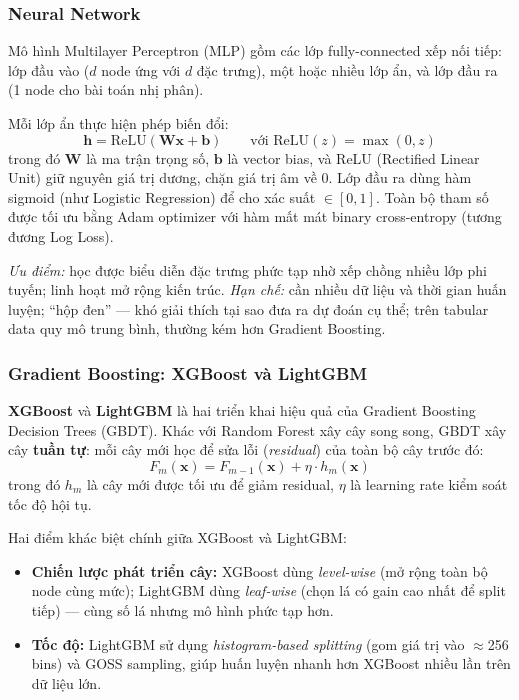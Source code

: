 \subsubsection{Neural Network}

Mô hình Multilayer Perceptron (MLP) gồm các lớp fully-connected
xếp nối tiếp: lớp đầu vào ($d$ node ứng với $d$ đặc trưng),
một hoặc nhiều lớp ẩn, và lớp đầu ra (1 node cho bài toán nhị phân).

Mỗi lớp ẩn thực hiện phép biến đổi:
\[
\mathbf{h} = \text{ReLU}(\mathbf{W}\mathbf{x} + \mathbf{b})
\qquad \text{với } \text{ReLU}(z) = \max(0, z)
\]
trong đó $\mathbf{W}$ là ma trận trọng số, $\mathbf{b}$ là vector bias,
và ReLU (Rectified Linear Unit) giữ nguyên giá trị dương, chặn giá trị âm về 0.
Lớp đầu ra dùng hàm sigmoid (như Logistic Regression) để cho xác suất $\in [0, 1]$.
Toàn bộ tham số được tối ưu bằng Adam optimizer
với hàm mất mát binary cross-entropy (tương đương Log Loss).

\textit{Ưu điểm:} học được biểu diễn đặc trưng phức tạp nhờ xếp chồng
nhiều lớp phi tuyến; linh hoạt mở rộng kiến trúc.
\textit{Hạn chế:} cần nhiều dữ liệu và thời gian huấn luyện;
``hộp đen'' --- khó giải thích tại sao đưa ra dự đoán cụ thể;
trên tabular data quy mô trung bình, thường kém hơn Gradient Boosting.

\subsubsection{Gradient Boosting: XGBoost và LightGBM}

\textbf{XGBoost} \cite{chen2016xgboost} và \textbf{LightGBM}
\cite{ke2017lightgbm} là hai triển khai hiệu quả của
Gradient Boosting Decision Trees (GBDT).
Khác với Random Forest xây cây song song,
GBDT xây cây \textbf{tuần tự}: mỗi cây mới học để sửa lỗi
(\textit{residual}) của toàn bộ cây trước đó:
\[
F_m(\mathbf{x}) = F_{m-1}(\mathbf{x}) + \eta \cdot h_m(\mathbf{x})
\]
trong đó $h_m$ là cây mới được tối ưu để giảm residual,
$\eta$ là learning rate kiểm soát tốc độ hội tụ.

Hai điểm khác biệt chính giữa XGBoost và LightGBM:
\begin{itemize}
    \item \textbf{Chiến lược phát triển cây:}
          XGBoost dùng \textit{level-wise} (mở rộng toàn bộ node cùng mức);
          LightGBM dùng \textit{leaf-wise} (chọn lá có gain cao nhất để split tiếp)
          --- cùng số lá nhưng mô hình phức tạp hơn.
    \item \textbf{Tốc độ:} LightGBM sử dụng \textit{histogram-based splitting}
          (gom giá trị vào $\approx$256 bins) và GOSS sampling,
          giúp huấn luyện nhanh hơn XGBoost nhiều lần trên dữ liệu lớn.
\end{itemize}

